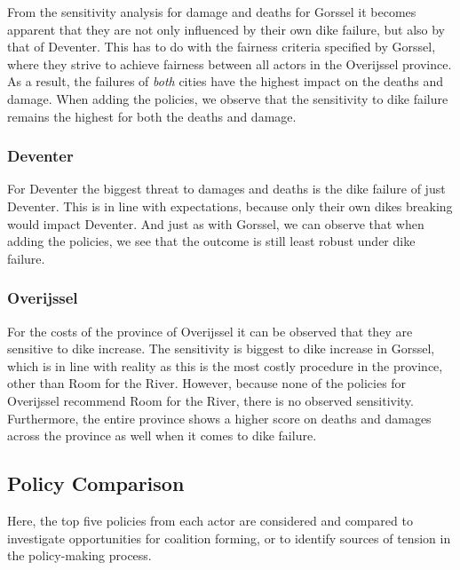 From the sensitivity analysis for damage and deaths for Gorssel it becomes apparent that they are not only influenced by their own dike failure, but also by that of Deventer. This has to do with the fairness criteria specified by Gorssel, where they strive to achieve fairness between all actors in the Overijssel province. As a result, the failures of \textit{both} cities have the highest impact on the deaths and damage. When adding the policies, we observe that the sensitivity to dike failure remains the highest for both the deaths and damage. 

\subsubsection{Deventer}

For Deventer the biggest threat to damages and deaths is the dike failure of just Deventer. This is in line with expectations, because only their own dikes breaking would impact Deventer. And just as with Gorssel, we can observe that when adding the policies, we see that the outcome is still least robust under dike failure. 

\subsubsection{Overijssel}

For the costs of the province of Overijssel it can be observed that they are sensitive to dike increase. The sensitivity is biggest to dike increase in Gorssel, which is in line with reality as this is the most costly procedure in the province, other than Room for the River. However, because none of the policies for Overijssel recommend Room for the River, there is no observed sensitivity. Furthermore, the entire province shows a higher score on deaths and damages across the province as well when it comes to dike failure. 

\subsection{Policy Comparison}
Here, the top five policies from each actor are considered and compared to investigate opportunities for coalition forming, or to identify sources of tension in the policy-making process.